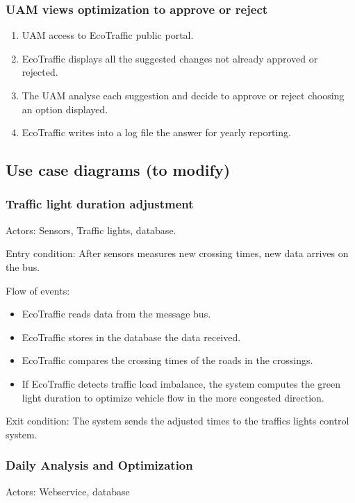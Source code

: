 \documentclass[12pt, a4paper, twoside, openright]{report}
\begin{document}
\subsubsection{UAM views optimization to approve or reject}\label{subsubsec:uam-views}

\begin{enumerate}
\item
  UAM access to EcoTraffic public portal.
\item
  EcoTraffic displays all the suggested changes not already approved or
  rejected.
\item
  The UAM analyse each suggestion and decide to approve or reject
  choosing an option displayed.
\item
  EcoTraffic writes into a log file the answer for yearly reporting.
\end{enumerate}

\subsection{Use case diagrams (to modify)}
\subsubsection{Traffic light duration adjustment}
Actors: Sensors, Traffic lights, database.

Entry condition: After sensors measures new crossing times, new data
arrives on the bus.

Flow of events:

\begin{itemize}
\item
  EcoTraffic reads data from the message bus.
\item
  EcoTraffic stores in the database the data received.
\item
  EcoTraffic compares the crossing times of the roads in the crossings.
\item
  If EcoTraffic detects traffic load imbalance, the system computes the
  green light duration to optimize vehicle flow in the more congested
  direction.
\end{itemize}

Exit condition: The system sends the adjusted times to the traffics
lights control system.


\subsubsection{Daily Analysis and Optimization}
Actors: Webservice, database
\end{document}
